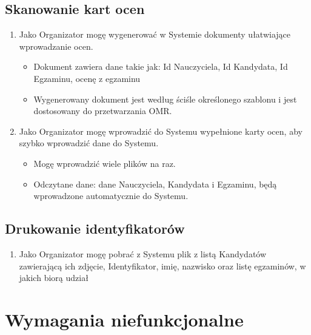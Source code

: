 \documentclass{article}
\begin{document}
\subsection{Skanowanie kart ocen}
\begin{enumerate}
    \item Jako Organizator mogę wygenerować w Systemie dokumenty ułatwiające wprowadzanie ocen.
    \begin{itemize}
        \item Dokument zawiera dane takie jak: Id Nauczyciela, Id Kandydata, Id Egzaminu, ocenę z egzaminu
        \item Wygenerowany dokument jest według ściśle określonego szablonu i  jest dostosowany do przetwarzania OMR.
    \end{itemize}
  \item Jako Organizator mogę wprowadzić do Systemu wypełnione karty ocen, aby szybko wprowadzić dane do Systemu.
    \begin{itemize}
        \item Mogę wprowadzić wiele plików na raz.
        \item Odczytane dane: dane Nauczyciela, Kandydata i Egzaminu, będą wprowadzone automatycznie do Systemu.
   \end{itemize}
\end{enumerate}

\subsection{Drukowanie identyfikatorów}
\begin{enumerate}
    \item Jako Organizator mogę pobrać z Systemu plik z listą Kandydatów zawierającą ich zdjęcie, Identyfikator, imię, nazwisko oraz listę egzaminów, w jakich biorą udział
        
\end{enumerate}

\section{Wymagania niefunkcjonalne}
\end{document}
